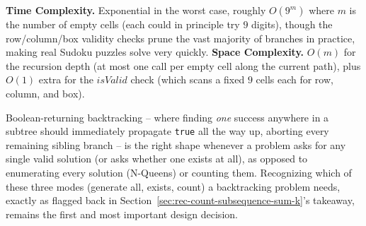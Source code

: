 \begin{complexitybox}
\textbf{Time Complexity.} Exponential in the worst case, roughly
$O(9^{m})$ where $m$ is the number of empty cells (each could in
principle try $9$ digits), though the row/column/box validity checks
prune the vast majority of branches in practice, making real Sudoku
puzzles solve very quickly.
\textbf{Space Complexity.} $O(m)$ for the recursion depth (at most one
call per empty cell along the current path), plus $O(1)$ extra for the
$\textit{isValid}$ check (which scans a fixed $9$ cells each for row,
column, and box).
\end{complexitybox}

\begin{takeawaybox}
Boolean-returning backtracking -- where finding \emph{one} success
anywhere in a subtree should immediately propagate \texttt{true} all the
way up, aborting every remaining sibling branch -- is the right shape
whenever a problem asks for any single valid solution (or asks whether
one exists at all), as opposed to enumerating every solution
(N-Queens) or counting them. Recognizing which of these three modes
(generate all, exists, count) a backtracking problem needs, exactly as
flagged back in Section~\ref{sec:rec-count-subsequence-sum-k}'s
takeaway, remains the first and most important design decision.
\end{takeawaybox}
